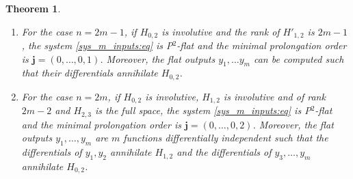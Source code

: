 \documentclass[10pt]{article}
\newcommand{\3}{\mathbf{3}}
\newcommand{\2}{\mathbf{2}}
\newcommand{\1}{\mathbf{1}}
\newcommand{\0}{\mathbf{0}}
\newcommand{\mbf}[1]{\mathbf{#1}}
\newtheorem{thm}{Theorem}
\begin{document}
\begin{thm}
\label{m-inputs-theorem}
\begin{enumerate}
\item For the case $n=2m-1$, if $H_{0,2}$ is involutive and the rank of $H'_{1,2}$ is $2m-1$,  the system \eqref{sys_m_inputs:eq} is P$^{2}$-flat and the minimal prolongation order is $\mbf{j}= (0,\dots,0,1)$. Moreover, the flat outputs $y_1,\dots y_m$ can be computed such that their differentials annihilate $H_{0,2}$.

\item For the case $n=2m$, if $H_{0,2}$ is involutive, $H_{1,2}$ is involutive and of rank $2m-2$ and $H_{2,3}$ is the full space, the system \eqref{sys_m_inputs:eq} is P$^{2}$-flat and the minimal prolongation order is $\mbf{j}= (0,\dots,0,2)$. Moreover, the flat outputs $y_1,\dots,y_m$ are $m$ functions differentially independent such that the differentials of $y_1,y_2$ annihilate $H_{1,2}$ and the differentials of $y_3,\dots,y_{m}$ annihilate $H_{0,2}$.
\end{enumerate}
\end{thm}
\end{document}
